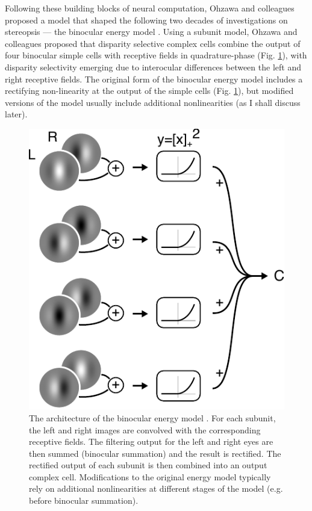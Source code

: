 Following these building blocks of neural computation, Ohzawa and colleagues proposed a model that shaped the following two decades of investigations on stereopsis --- the binocular energy model \cite{Ohzawa:1990cq}. Using a subunit model, Ohzawa and colleagues proposed that disparity selective complex cells combine the output of four binocular simple cells with receptive fields in quadrature-phase  (Fig. \ref{fig:dem}), with disparity selectivity emerging due to interocular differences between the left and right receptive fields. The original form of the binocular energy model includes a rectifying non-linearity at the output of the simple cells (Fig. \ref{fig:dem}), but modified versions of the model usually include additional nonlinearities (as I shall discuss later).

\begin{figure}
  \centering
  \includegraphics{dem-arch}
  \caption[The architecture of the binocular energy model.]{The architecture of the binocular energy model \cite{Ohzawa:1990cq}. For each subunit, the left and right images are convolved with the corresponding receptive fields. The filtering output for the left and right eyes are then summed (binocular summation) and the result is rectified. The rectified output of each subunit is then combined into an output complex cell. Modifications to the original energy model typically rely on additional nonlinearities at different stages of the model (e.g. before binocular summation).}
  \label{fig:dem}
\end{figure}

